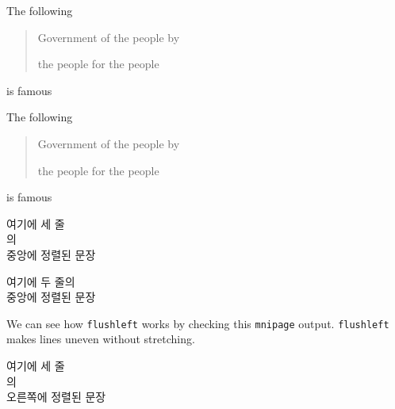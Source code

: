 \documentclass[11pt]{article}
\begin{document}
The following
\begin{quote}
Government of the people by

the people for the people
\end{quote}
is famous

The following
\begin{quotation}
Government of the people by

the people for the people
\end{quotation}
is famous

\begin{center}
여기에 세 줄 \\ 
의\\ 
중앙에 정렬된 문장
\end{center}

\centerline{여기에 두 줄의\\ 중앙에 정렬된 문장}

\begin{flushleft}
We can see how \texttt{flushleft} works by checking this \texttt{mnipage} output. \texttt{flushleft} makes lines uneven without stretching.
\end{flushleft}

\begin{flushright}
여기에 세 줄 \\
의\\
오른쪽에 정렬된 문장
\end{flushright}
\end{document}
